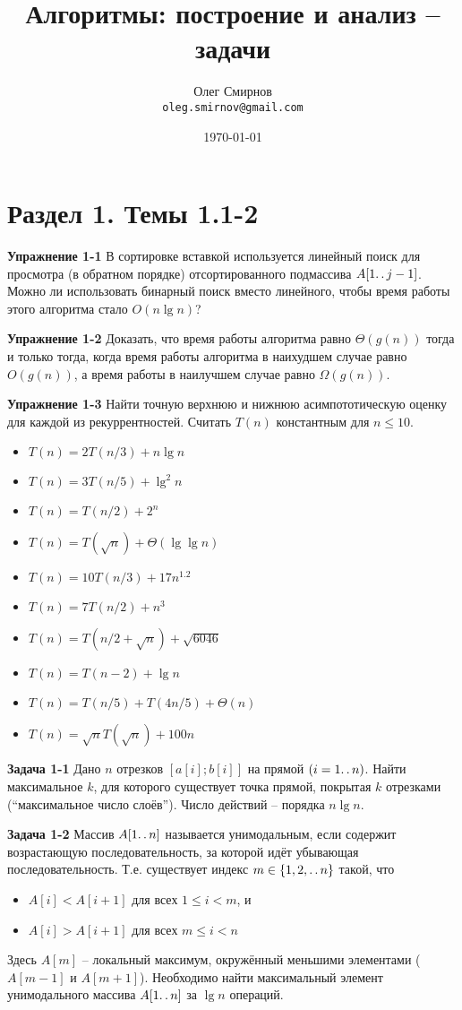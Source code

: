 \documentclass[a4paper,11pt]{article}
\author{Олег Смирнов\\
\texttt{oleg.smirnov@gmail.com}}
\date{\today}
\title{Алгоритмы: построение и анализ -- задачи}
\begin{document}
\section*{Раздел 1. Темы 1.1-2}
\textbf{Упражнение 1-1} В сортировке вставкой используется линейный поиск для просмотра (в обратном порядке) отсортированного подмассива $A[1 \ldotp\ldotp j-1]$. Можно ли использовать бинарный поиск вместо линейного, чтобы время работы этого алгоритма стало $O(n \lg n)$?

\textbf{Упражнение 1-2} Доказать, что время работы алгоритма равно $\Theta(g(n))$ тогда и только тогда, когда время работы алгоритма в наихудшем случае равно $O(g(n))$, а время работы в наилучшем случае равно $\Omega(g(n))$.

\textbf{Упражнение 1-3} Найти точную верхнюю и нижнюю асимпототическую оценку для каждой из рекуррентностей. Считать $T(n)$ константным для $n \leqslant 10$.
\begin{itemize}
\item $T(n) = 2 T(n/3) + n \lg{n}$
\item $T(n) = 3 T(n/5) + \lg^2 {n}$
\item $T(n) = T(n/2) + 2^n$
\item $T(n) = T(\sqrt{n}) + \Theta(\lg \lg n)$
\item $T(n) = 10 T(n/3) + 17 n^{1.2}$
\item $T(n) = 7 T(n/2) + n^3$
\item $T(n) = T(n/2 + \sqrt{n}) + \sqrt{6046}$
\item $T(n) = T(n-2) + \lg{n}$
\item $T(n) = T(n/5)+ T(4n/5) +\Theta(n)$
\item $T(n) = \sqrt{n} T(\sqrt{n}) + 100 n$
\end{itemize}

\textbf{Задача 1-1} Дано $n$ отрезков $[a[i]; b[i]]$ на прямой $(i = 1 \ldotp\ldotp n)$. Найти максимальное $k$, для которого существует точка прямой, покрытая $k$ отрезками (``максимальное число слоёв''). Число действий -- порядка $n \lg n$.

\textbf{Задача 1-2} Массив $A[1 \ldotp\ldotp n]$ называется унимодальным, если содержит возрастающую последовательность, за которой идёт убывающая последовательность. Т.е. существует индекс $m \in \{1, 2, \ldotp\ldotp n\}$ такой, что
\begin{itemize}
\item $A[i] < A[i+1]$ для всех $1 \leqslant i < m$, и
\item $A[i] > A[i+1]$ для всех $m \leqslant i < n$
\end{itemize}
Здесь $A[m]$ -- локальный максимум, окружённый меньшими элементами ($A[m-1]$ и $A[m+1]$). Необходимо найти максимальный элемент унимодального массива $A[1 \ldotp\ldotp n]$ за $\lg n$ операций.
\end{document}
